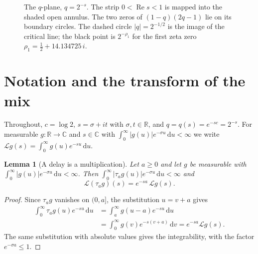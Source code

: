 \documentclass[11pt]{amsart}
\newtheorem{lemma}[theorem]{Lemma}
\theoremstyle{definition}
\theoremstyle{remark}
\DeclareMathOperator{\re}{Re}
\DeclareMathOperator{\im}{Im}
\newcommand{\C}{\mathbb{C}}
\newcommand{\R}{\mathbb{R}}
\newcommand{\cL}{\mathcal{L}}
\newcommand{\dd}{\,\mathrm{d}}
\begin{document}
\begin{figure}[t]
\centering
{}
\caption{The $q$-plane, $q=2^{-s}$. The strip $0<\re s<1$ is mapped into the shaded open annulus.
The two zeros of $(1-q)(2q-1)$ lie on its boundary circles. The dashed circle $|q|=2^{-1/2}$ is the
image of the critical line; the black point is $2^{-\rho_1}$ for the first zeta zero
$\rho_1=\tfrac12+14.134725\,i$.}
\label{fig:annulus}
\end{figure}

\section{Notation and the transform of the mix}\label{sec:laplace}

Throughout, $c=\log 2$, $s=\sigma+it$ with $\sigma,t\in\R$, and $q=q(s)=e^{-sc}=2^{-s}$.
For measurable $g\colon\R\to\C$ and $s\in\C$ with $\int_0^\infty|g(u)|e^{-\sigma u}\dd u<\infty$ we write
$\cL g(s)=\int_0^\infty g(u)e^{-su}\dd u$.

\begin{lemma}[A delay is a multiplication]\label{lem:delay}
Let $a\ge0$ and let $g$ be measurable with $\int_0^\infty|g(u)|e^{-\sigma u}\dd u<\infty$. Then
$\int_0^\infty|\tau_ag(u)|e^{-\sigma u}\dd u<\infty$ and
\[
\cL(\tau_a g)(s)=e^{-sa}\,\cL g(s).
\]
\end{lemma}

\begin{proof}
Since $\tau_ag$ vanishes on $(0,a]$, the substitution $u=v+a$ gives
\begin{align*}
\int_0^\infty \tau_ag(u)e^{-su}\dd u&=\int_a^\infty g(u-a)e^{-su}\dd u\\
&=\int_0^\infty g(v)e^{-s(v+a)}\dd v=e^{-sa}\cL g(s).
\end{align*}
The same substitution with absolute values gives the integrability, with the factor
$e^{-\sigma a}\le 1$.
\end{proof}
\end{document}
